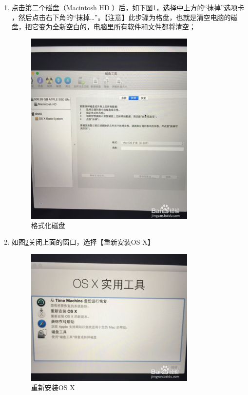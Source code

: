 \documentclass{article}
\begin{document}
\begin{enumerate}
\begin{figure}[!htb]
 \end{figure}

\item 点击第二个磁盘（Macintosh HD ）后，如下图\ref{modiao}，选择中上方的“抹掉”选项卡 ，然后点击右下角的“抹掉…”。【注意】此步骤为格盘，也就是清空电脑的磁盘，把它变为全新空白的，电脑里所有软件和文件都将清空；
 \begin{figure}[!htb] %
 \centering
 \includegraphics[width=0.8\textwidth]{figures/modiao.png}
  \caption{格式化磁盘}
\label{modiao}

 \end{figure}

\item 如图\ref{jixu}关闭上面的窗口，选择【重新安装OS X】
 \begin{figure}[!htb] %
 \centering
 \includegraphics[width=0.8\textwidth]{figures/cipangongju.png}
 \caption{重新安装OS X} 
\label{jixu}


\end{figure}
\end{enumerate}
\end{document}
